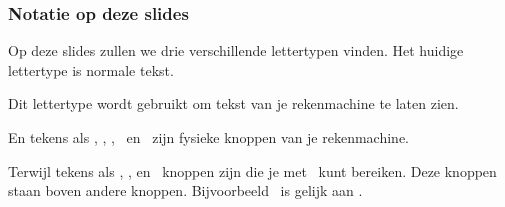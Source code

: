 \begin{frame}
\frametitle{Notatie op deze slides}

Op deze slides zullen we drie verschillende lettertypen vinden.
Het huidige lettertype is normale tekst.

\pause
{\tifont Dit lettertype wordt gebruikt om tekst van je rekenmachine te laten zien.}

\pause
En tekens als \tiPRGM, \tiGRAPH, \tiCOS,  \tiXTn\, en \tiENTER\, zijn fysieke knoppen van je rekenmachine.

\pause
Terwijl tekens als \tiLOne, \tiACOS, en \tiMATRIX\, knoppen zijn die je met \tiSecond\, kunt bereiken.
Deze knoppen staan boven andere knoppen. Bijvoorbeeld \tiTEST\, is gelijk aan \tiSecond\tiMATH.

\vspace{10 mm}
\end{frame}


